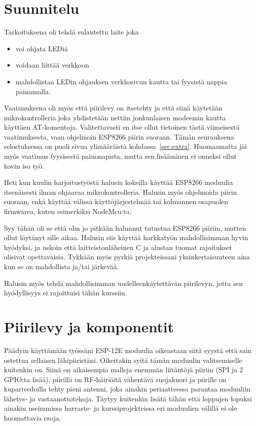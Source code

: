 \section{Suunnitelu}
Tarkoituksena oli tehdä sulautettu laite joka
\begin{itemize}
  \item voi ohjata LEDiä
  \item voidaan liittää verkkoon
  \item mahdollistaa LEDin ohjauksen verkkosivun kautta tai fyysistä nappia
    painamalla.
\end{itemize}
Vaatimuksena oli myös että piirilevy on itsetehty ja että siinä käytetään
mikrokontrolleria joka yhdistetään nettiin jonkunlaisen modeemin kautta
käyttäen AT-komentoja. Valitettavasti en itse ollut tietoinen tästä viimeisestä
vaatimuksesta, vaan ohjelmoin ESP8266 piirin suoraan. Tämän seurauksena
selostuksessa on puoli sivua ylimääräistä kohdassa~\ref{sec:extra}. Huomaamatta
jäi myös vaatimus fyysisestä painonapista, mutta sen lisääminen ei
onneksi ollut kovin iso työ.

Heti kun kuulin harjoitustyöstä halusin kokeilla käyttää ESP8266 moduulia
itsenäisesti ilman ohjaavaa mikrokontrolleria. Halusin myös ohjelmoida piirin
suoraan, enkä käyttää välissä käyttöjärjestelmää tai kolmannen osapuolen
firmwarea, kuten esimerkiksi NodeMcu:ta.\cite{nodemcu}

Syy tähän oli se että olin jo pitkään halunnut tutustua ESP8266 piiriin, mutten
ollut löytänyt sille aikaa. Halusin siis käyttää harkkatyön mahdollisimman
hyvin hyödyksi, ja uskoin että laitteistonläheinen C ja alustan tuomat
rajoitukset olisivat opettavaisia. Tykkään myös pyrkiä projekteissani
yksinkertaisuuteen aina kun se on mahdollista ja/tai järkevää.

Halusin myös tehdä mahdollisimman uudelleenkäytettävän piirilevyn, jotta sen
hyödyllisyys ei rajoittuisi tähän kurssiin.

\section{Piirilevy ja komponentit}
Päädyin käyttämään työssäni ESP-12E moduulia oikeastaan siitä syystä että sain
ostettua sellaisen lähipiiristäni. Oikeitakin syitä tämän moduulin
valitsemiselle kuitenkin on. Siinä on aikaisempia malleja enemmän liitäntöjä
piiriin (SPI ja 2 GPIO:ta lisää), piirillä on RF-häiriöitä vähentävä suojakuori
ja piirille on kuparivedoilla tehty pieni antenni, joka ainakin periaatteessa
parantaa moduuliin lähetys- ja vastaanottotehoja. Täytyy kuitenkin lisätä tähän
että loppujen lopuksi ainakin useimmissa harraste- ja kurssiprojekteissa eri
moduulien välillä ei ole huomattavia eroja.

